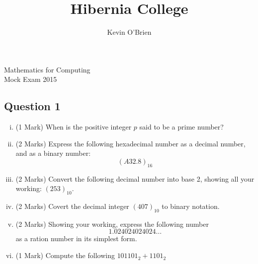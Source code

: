 \documentclass[12pt]{article} %
\title{Hibernia College}
\author{Kevin O'Brien}
\begin{document}
\begin{center}
\huge{Mathematics for Computing}\\
\LARGE{Mock Exam 2015}
\end{center}

\subsection*{Question 1}

\begin{enumerate}[(i)]
	\item (1 Mark) When is the positive integer $p$ said to be a prime number?
	\item (2 Marks) Express the following hexadecimal number as a decimal number, and as a binary number: \[(A32.8)_{16}\]
	
	\item (2 Marks) Convert the following decimal number into base 2, showing all your working:
	$(253)_{10}$. 
		\item (2 Marks) Covert the decimal integer $(407)_{10}$ to binary notation.
		
		\item (2 Marks) Showing your working, express the following number 
		\[ 1.024024024024\ldots\]
		as a ration number in its simplest form.
	\item (1 Mark) Compute the following $101101_2 + 1101_2$ 
\end{enumerate}
\end{document}
